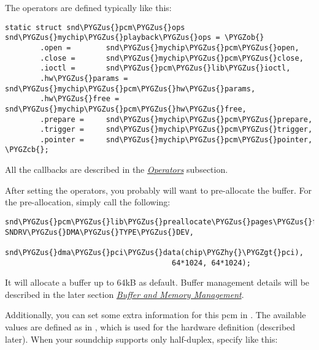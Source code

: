 \documentclass[a4paper,8pt,english]{sphinxmanual}
\def\PYGZus{\char`\_}
\def\PYGZob{\char`\{}
\def\PYGZcb{\char`\}}
\def\PYGZgt{\char`\>}
\def\PYGZhy{\char`\-}
\begin{document}
The operators are defined typically like this:

\begin{Verbatim}[commandchars=\\\{\}]
static struct snd\PYGZus{}pcm\PYGZus{}ops snd\PYGZus{}mychip\PYGZus{}playback\PYGZus{}ops = \PYGZob{}
        .open =        snd\PYGZus{}mychip\PYGZus{}pcm\PYGZus{}open,
        .close =       snd\PYGZus{}mychip\PYGZus{}pcm\PYGZus{}close,
        .ioctl =       snd\PYGZus{}pcm\PYGZus{}lib\PYGZus{}ioctl,
        .hw\PYGZus{}params =   snd\PYGZus{}mychip\PYGZus{}pcm\PYGZus{}hw\PYGZus{}params,
        .hw\PYGZus{}free =     snd\PYGZus{}mychip\PYGZus{}pcm\PYGZus{}hw\PYGZus{}free,
        .prepare =     snd\PYGZus{}mychip\PYGZus{}pcm\PYGZus{}prepare,
        .trigger =     snd\PYGZus{}mychip\PYGZus{}pcm\PYGZus{}trigger,
        .pointer =     snd\PYGZus{}mychip\PYGZus{}pcm\PYGZus{}pointer,
\PYGZcb{};
\end{Verbatim}

All the callbacks are described in the {\hyperref[sound/kernel\string-api/writing\string-an\string-alsa\string-driver:operators]{\emph{Operators}}} subsection.

After setting the operators, you probably will want to pre-allocate the
buffer. For the pre-allocation, simply call the following:

\begin{Verbatim}[commandchars=\\\{\}]
snd\PYGZus{}pcm\PYGZus{}lib\PYGZus{}preallocate\PYGZus{}pages\PYGZus{}for\PYGZus{}all(pcm, SNDRV\PYGZus{}DMA\PYGZus{}TYPE\PYGZus{}DEV,
                                      snd\PYGZus{}dma\PYGZus{}pci\PYGZus{}data(chip\PYGZhy{}\PYGZgt{}pci),
                                      64*1024, 64*1024);
\end{Verbatim}

It will allocate a buffer up to 64kB as default. Buffer management
details will be described in the later section {\hyperref[sound/kernel\string-api/writing\string-an\string-alsa\string-driver:buffer\string-and\string-memory\string-management]{\emph{Buffer and Memory
Management}}}.

Additionally, you can set some extra information for this pcm in
. The available values are defined as
 in , which is used for the
hardware definition (described later). When your soundchip supports only
half-duplex, specify like this:
\end{document}
